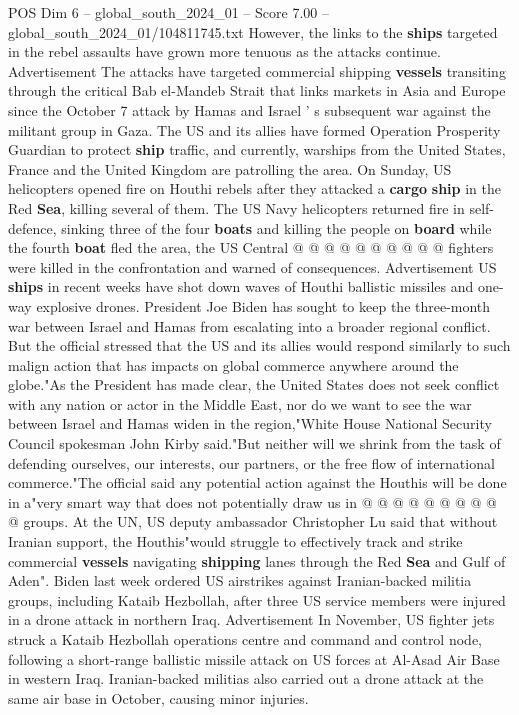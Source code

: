 \begin{textsample}{POS Dim 6 – global\_south\_2024\_01 – Score 7.00 – global\_south\_2024\_01/104811745.txt}
However, the links to the \textbf{ships} targeted in the rebel assaults have grown more tenuous as the attacks continue.
Advertisement The attacks have targeted commercial shipping \textbf{vessels} transiting through the critical Bab el-Mandeb Strait that links markets in Asia and Europe since the October 7 attack by Hamas and Israel ' s subsequent war against the militant group in Gaza.
The US and its allies have formed Operation Prosperity Guardian to protect \textbf{ship} traffic, and currently, warships from the United States, France and the United Kingdom are patrolling the area.
On Sunday, US helicopters opened fire on Houthi rebels after they attacked a \textbf{cargo} \textbf{ship} in the Red \textbf{Sea}, killing several of them.
The US Navy helicopters returned fire in self-defence, sinking three of the four \textbf{boats} and killing the people on \textbf{board} while the fourth \textbf{boat} fled the area, the US Central @ @ @ @ @ @ @ @ @ @ fighters were killed in the confrontation and warned of consequences.
Advertisement US \textbf{ships} in recent weeks have shot down waves of Houthi ballistic missiles and one-way explosive drones.
President Joe Biden has sought to keep the three-month war between Israel and Hamas from escalating into a broader regional conflict.
But the official stressed that the US and its allies would respond similarly to such malign action that has impacts on global commerce anywhere around the globe."As the President has made clear, the United States does not seek conflict with any nation or actor in the Middle East, nor do we want to see the war between Israel and Hamas widen in the region,"White House National Security Council spokesman John Kirby said."But neither will we shrink from the task of defending ourselves, our interests, our partners, or the free flow of international commerce."The official said any potential action against the Houthis will be done in a"very smart way that does not potentially draw us in @ @ @ @ @ @ @ @ @ @ groups.
At the UN, US deputy ambassador Christopher Lu said that without Iranian support, the Houthis"would struggle to effectively track and strike commercial \textbf{vessels} navigating \textbf{shipping} lanes through the Red \textbf{Sea} and Gulf of Aden".
Biden last week ordered US airstrikes against Iranian-backed militia groups, including Kataib Hezbollah, after three US service members were injured in a drone attack in northern Iraq.
Advertisement In November, US fighter jets struck a Kataib Hezbollah operations centre and command and control node, following a short-range ballistic missile attack on US forces at Al-Asad Air Base in western Iraq.
Iranian-backed militias also carried out a drone attack at the same air base in October, causing minor injuries.

\end{textsample}
